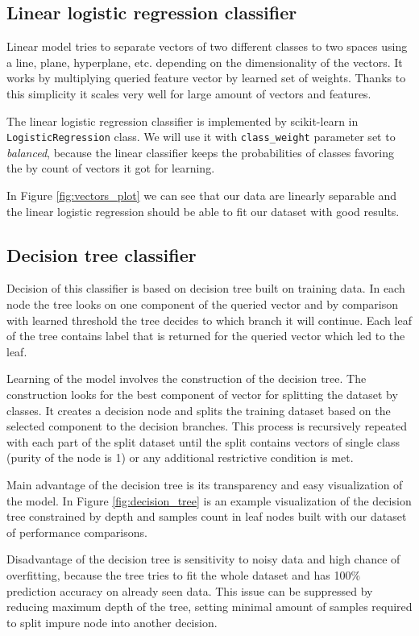 \subsection{Linear logistic regression classifier}
Linear model tries to separate vectors of two different classes to two spaces
using a line, plane, hyperplane, etc. depending on the dimensionality of the
vectors. It works by multiplying queried feature vector by learned set of
weights. Thanks to this simplicity it scales very well for large amount of
vectors and features.

The linear logistic regression classifier is implemented by scikit-learn in
\texttt{Logistic\-Regression} class. We will use it with \texttt{class\_weight}
parameter set to \emph{balanced}, because the linear classifier keeps the
probabilities of classes favoring the by count of vectors it got for learning.

In Figure \ref{fig:vectors_plot} we can see that our data are linearly separable
and the linear logistic regression should be able to fit our dataset with good results.

\subsection{Decision tree classifier}
Decision of this classifier is based on decision tree built on training data.
In each node the tree looks on one component of the queried vector and by
comparison with learned threshold the tree decides to which branch it will
continue. Each leaf of the tree contains label that is returned for the queried
vector which led to the leaf.

Learning of the model involves the construction of the decision tree. The
construction looks for the best component of vector for splitting the dataset by
classes. It creates a decision node and splits the training dataset based on the
selected component to the decision branches. This process is recursively
repeated with each part of the split dataset until the split contains vectors of
single class (purity of the node is 1) or any additional restrictive condition
is met.

Main advantage of the decision tree is its transparency and easy visualization
of the model. In Figure \ref{fig:decision_tree} is an example visualization of
the decision tree constrained by depth and samples count in leaf nodes built with
our dataset of performance comparisons.

Disadvantage of the decision tree is sensitivity to noisy data and high
chance of overfitting, because the tree tries to fit the whole dataset and has
100\% prediction accuracy on already seen data. This issue can be suppressed by
reducing maximum depth of the tree, setting minimal amount of samples required
to split impure node into another decision.

